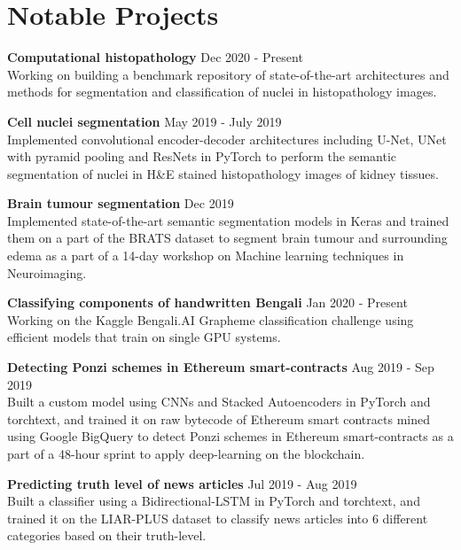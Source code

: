 \documentclass[letterpaper]{article}
\renewenvironment{itemize}{
  \begin{list}{}{
    \setlength{\leftmargin}{1.5em}
  }
}{
  \end{list}
}
\newcommand{\datefont}[1]{\textcolor{black!80}{\small{#1}}}
\begin{document}
\section*{Notable Projects}
  \begin{itemize}
    \item
    \textbf{Computational histopathology}
    \hfill{\datefont{Dec 2020 - Present}}\\
      Working on building a benchmark repository of state-of-the-art architectures and methods for segmentation and classification of nuclei in histopathology images.

    \item
    \textbf{Cell nuclei segmentation}
    \hfill{\datefont{May 2019 - July 2019}}\\
      Implemented convolutional encoder-decoder architectures including U-Net, UNet with pyramid pooling and ResNets in PyTorch to perform the semantic segmentation of nuclei in H\&E stained histopathology images of kidney tissues.

    \item
    \textbf{Brain tumour segmentation}
    \hfill{\datefont{Dec 2019}}\\
       Implemented state-of-the-art semantic segmentation models in Keras and trained them on a part of the BRATS dataset to segment brain tumour and surrounding edema as a part of a 14-day workshop on Machine learning techniques in Neuroimaging.

    \item
    \textbf{Classifying components of handwritten Bengali}
    \hfill{\datefont{Jan 2020 - Present}}\\
      Working on the Kaggle Bengali.AI Grapheme classification challenge
    using efficient models that train on single GPU systems.

    \item
    \textbf{Detecting Ponzi schemes in Ethereum smart-contracts}
    \hfill{\datefont{Aug 2019 - Sep 2019}}\\
      Built a custom model using CNNs and Stacked Autoencoders in PyTorch and torchtext, and trained it on raw bytecode of Ethereum smart contracts mined using Google BigQuery to detect Ponzi schemes in Ethereum smart-contracts as a part of a 48-hour sprint to apply deep-learning on the blockchain.

    \item
    \textbf{Predicting truth level of news articles}
    \hfill{\datefont{Jul 2019 - Aug 2019}}\\
      Built a classifier using a Bidirectional-LSTM in PyTorch and torchtext, and trained it on the LIAR-PLUS dataset to classify news articles into 6 different categories based on their truth-level.


\end{itemize}
\end{document}

